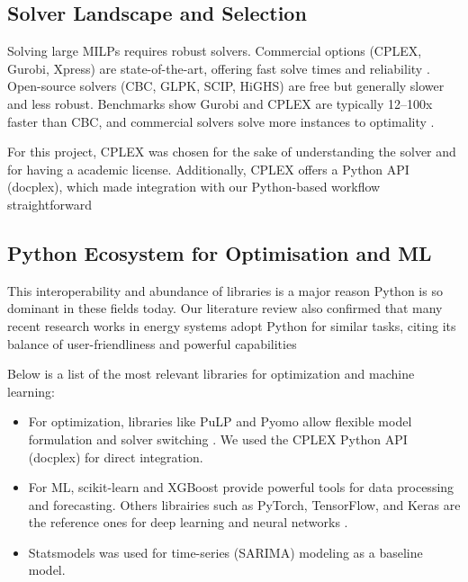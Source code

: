\subsection{Solver Landscape and Selection}
Solving large MILPs requires robust solvers. Commercial options (CPLEX, Gurobi, Xpress) are 
state-of-the-art, offering fast solve times and reliability \cite{mitchell2011pulp, forrest2018cbc}. 
Open-source solvers (CBC, GLPK, SCIP, HiGHS) are free but generally slower and less robust. 
Benchmarks show Gurobi and CPLEX are typically 12--100x faster than CBC, and commercial solvers 
solve more instances to optimality \cite{mittelmann2023benchmarks}.

For this project, CPLEX was chosen for the sake of understanding the solver and for having a 
academic license. Additionally, CPLEX offers a Python API (docplex), which made integration with 
our Python-based workflow straightforward

\subsection{Python Ecosystem for Optimisation and ML}
This interoperability and abundance of libraries is a major reason Python is so dominant in these 
fields today. Our literature review also confirmed that many recent research works in energy systems 
adopt Python for similar tasks, citing its balance of user-friendliness and powerful capabilities

Below is a list of the most relevant libraries for optimization and machine learning:

\begin{itemize}
    \item For optimization, libraries like PuLP and Pyomo allow flexible model formulation and 
    solver switching \cite{mitchell2011pulp}. We used the CPLEX Python API (docplex) for direct 
    integration. 
    \item For ML, scikit-learn and XGBoost provide powerful tools for data processing and 
    forecasting. Others librairies such as PyTorch, TensorFlow, and Keras are the reference ones 
    for deep learning and neural networks \cite{scikit-learn}. 
    \item Statsmodels was used for time-series (SARIMA) modeling as a baseline model.
\end{itemize}

\newpage
